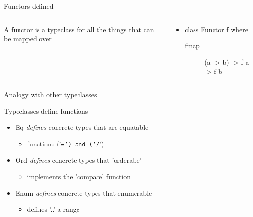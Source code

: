 \documentclass[presetation]{beamer}
\begin{document}
\begin{frame}[label={sec:orgdc0e7a4}]{Functors defined}
\begin{columns}
\begin{column}{.48\columnwidth}
\begin{definition}[definition]
A functor is a typeclass for all the things that can be mapped over

\pause
\end{definition}
\end{column}
\begin{column}{.48\columnwidth}
\begin{definition}
\begin{itemize}
\item class Functor f where
\begin{description}
\item[{fmap}] (a -> b) -> f a -> f b
\end{description}
\end{itemize}
\end{definition}
\end{column}
\end{columns}
\end{frame}


\begin{frame}[fragile,label={sec:org0d9148a}]{Analogy with other typeclasses}
 \begin{block}{Typeclasses define functions}
\begin{itemize}
\item Eq \emph{defines} concrete types that are equatable
\begin{itemize}
\item functions ('\texttt{=') and ('/}')
\end{itemize}
\item Ord \emph{defines} concrete types that 'orderabe'
\begin{itemize}
\item implements the 'compare' function
\end{itemize}
\item Enum \emph{defines} concrete types that enumerable
\begin{itemize}
\item defines '..' a range
\end{itemize}
\end{itemize}
\end{block}
\end{frame}
\end{document}
